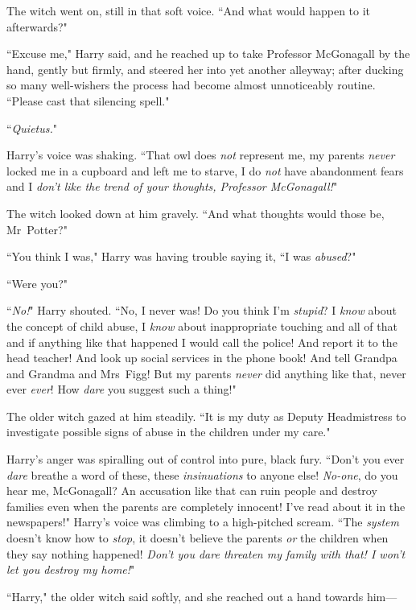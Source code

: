 The witch went on, still in that soft voice. ``And what would happen to it afterwards?"

``Excuse me," Harry said, and he reached up to take Professor McGonagall by the hand, gently but firmly, and steered her into yet another alleyway; after ducking so many well-wishers the process had become almost unnoticeably routine. ``Please cast that silencing spell."

``\emph{Quietus.}"

Harry's voice was shaking. ``That owl does \emph{not} represent me, my parents \emph{never} locked me in a cupboard and left me to starve, I do \emph{not} have abandonment fears and I \emph{don't like the trend of your thoughts, Professor McGonagall!}"

The witch looked down at him gravely. ``And what thoughts would those be, Mr~Potter?"

``You think I was," Harry was having trouble saying it, ``I was \emph{abused}?"

``Were you?"

``\emph{No!}" Harry shouted. ``No, I never was! Do you think I'm \emph{stupid}? I \emph{know} about the concept of child abuse, I \emph{know} about inappropriate touching and all of that and if anything like that happened I would call the police! And report it to the head teacher! And look up social services in the phone book! And tell Grandpa and Grandma and Mrs~Figg! But my parents \emph{never} did anything like that, never ever \emph{ever}! How \emph{dare} you suggest such a thing!"

The older witch gazed at him steadily. ``It is my duty as Deputy Headmistress to investigate possible signs of abuse in the children under my care."

Harry's anger was spiralling out of control into pure, black fury. ``Don't you ever \emph{dare} breathe a word of these, these \emph{insinuations} to anyone else! \emph{No-one}, do you hear me, McGonagall? An accusation like that can ruin people and destroy families even when the parents are completely innocent! I've read about it in the newspapers!" Harry's voice was climbing to a high-pitched scream. ``The \emph{system} doesn't know how to \emph{stop}, it doesn't believe the parents \emph{or} the children when they say nothing happened! \emph{Don't you dare threaten my family with that! I won't let you destroy my home!}"

``Harry," the older witch said softly, and she reached out a hand towards him—

